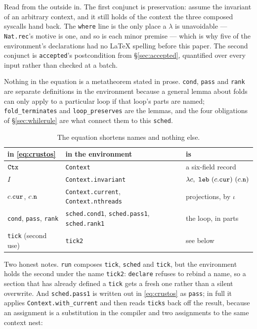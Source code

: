 \documentclass[11pt]{article}
\newcommand{\code}[1]{\texttt{#1}}
\begin{document}
Read from the outside in. The first conjunct is preservation: assume the
invariant of an arbitrary context, and it still holds of the context the three
composed syscalls hand back. The \code{where} line is the only place a
$\lambda$ is unavoidable --- \code{Nat.rec}'s motive is one, and so is each
minor premise --- which is why five of the environment's declarations had no
\LaTeX{} spelling before this paper. The second conjunct is
\code{accepted}'s postcondition from \S\ref{sec:accepted}, quantified over
every input rather than checked at a batch.

Nothing in the equation is a metatheorem stated in prose. \code{cond},
\code{pass} and \code{rank} are separate definitions in the environment
because a general lemma about folds can only apply to a particular loop if
that loop's parts are named; \code{fold\_terminates} and
\code{loop\_preserves} are the lemmas, and the four obligations of
\S\ref{sec:whilerule} are what connect them to this \code{sched}.

\begin{table}[h]
\centering
\small
\begin{tabular}{lll}
\toprule
in \eqref{eq:crustos} & in the environment & is \\
\midrule
$\ctx$ & \code{Context} & a six-field record \\
$I$ & \code{Context.invariant} & $\lambda c,\ \code{leb}\ (\cur{c})\ (\nth{c})$ \\
$\cur{c}$, $\nth{c}$ & \code{Context.current}, \code{Context.nthreads} & projections, by $\iota$ \\
\code{cond}, \code{pass}, \code{rank} & \code{sched.cond1}, \code{sched.pass1}, \code{sched.rank1} & the loop, in parts \\
\code{tick} (second use) & \code{tick2} & see below \\
\bottomrule
\end{tabular}
\caption{The equation shortens names and nothing else.}
\label{tab:abbrev}
\end{table}

Two honest notes. \code{run} composes \code{tick}, \code{sched} and
\code{tick}, but the environment holds the second under the name \code{tick2}:
\code{declare} refuses to rebind a name, so a section that has already defined
a \code{tick} gets a fresh one rather than a silent overwrite. And
\code{sched.pass1} is written out in \eqref{eq:crustos} as \code{pass}; in
full it applies \code{Context.with\_current} and then reads \code{ticks} back
off the result, because an assignment is a substitution in the compiler and
two assignments to the same context nest:
\end{document}
